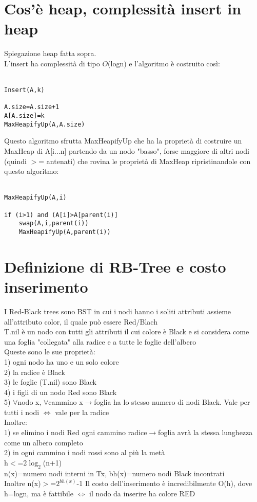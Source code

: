 \documentclass[12pt,oneside,a4paper]{article}
\newcommand\Omicron{O}
\begin{document}
\section{Cos'è heap, complessità insert in heap}
Spiegazione heap fatta sopra.\\
L'insert ha complessità di tipo $\Omicron$(logn) e l'algoritmo è costruito così:\\\\
\begin{lstlisting}[style=pseudocodice]
Insert(A,k)

A.size=A.size+1
A[A.size]=k
MaxHeapifyUp(A,A.size)
\end{lstlisting}
Questo algoritmo sfrutta MaxHeapifyUp che ha la proprietà di costruire un MaxHeap di A[i...n] partendo da un nodo "basso", forse maggiore di altri nodi (quindi $>$= antenati) che rovina le proprietà di MaxHeap ripristinandole con questo algoritmo:\\\\
\begin{lstlisting}[style=pseudocodice]
MaxHeapifyUp(A,i)

if (i>1) and (A[i]>A[parent(i)]
	swap(A,i,parent(i))
	MaxHeapifyUp(A,parent(i))
\end{lstlisting}
\newpage
\section{Definizione di RB-Tree e costo inserimento}
I Red-Black trees sono BST in cui i nodi hanno i soliti attributi assieme all'attributo color, il quale può essere Red/Blach\\
T.nil è un nodo con tutti gli attributi il cui colore è Black e si considera come una foglia "collegata" alla radice e a tutte le foglie dell'albero\\
Queste sono le sue proprietà:\\
1) ogni nodo ha uno e un solo colore \\
2) la radice è Black\\
3) le foglie (T.nil) sono Black\\
4) i figli di un nodo Red sono Black\\
5) $\forall$nodo x, $\forall$cammino x$\to$foglia ha lo stesso numero di nodi Black. Vale per tutti i nodi $\iff$ vale per la radice\\
Inoltre:\\
1) se elimino i nodi Red ogni cammino radice$\to$foglia avrà la stessa lunghezza come un albero completo \\
2) in ogni cammino i nodi rossi sono al più la metà \\
h$<$=2$\log_{2}$(n+1)\\
n(x)=numero nodi interni in Tx, bh(x)=numero nodi Black incontrati\\
Inoltre n(x)$>$=$2^{bh(x)}$-1
Il costo dell'inserimento è incredibilmente O(h), dove h=logn, ma è fattibile $\iff$ il nodo da inserire ha colore RED\\
\newpage
\end{document}
